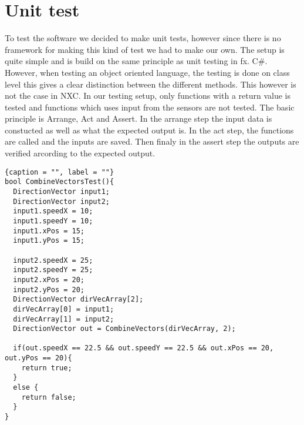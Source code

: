\section{Unit test}

To test the software we decided to make unit tests, however since there is no
framework for making this kind of test we had to make our own. The setup is
quite simple and is build on the same principle as unit testing in fx. C\#.
However, when testing an object oriented language, the testing is done on class
level this gives a clear distinction between the different methods. This however
is not the case in NXC. In our testing setup, only functions with a return
value is tested and functions which uses input from the sensors are not
tested. The basic principle is Arrange, Act and Assert. In the arrange step the
input data is constucted as well as what the expected output is. In the act
step, the functions are called and the inputs are saved. Then finaly in the
assert step the outputs are verified arcording to the expected output. 

\begin{minipage}[H]{\linewidth}
\begin{lstlisting}{caption = "", label = ""}
bool CombineVectorsTest(){
  DirectionVector input1;
  DirectionVector input2;
  input1.speedX = 10;
  input1.speedY = 10;
  input1.xPos = 15;
  input1.yPos = 15;
  
  input2.speedX = 25;
  input2.speedY = 25;
  input2.xPos = 20;
  input2.yPos = 20;
  DirectionVector dirVecArray[2];
  dirVecArray[0] = input1;
  dirVecArray[1] = input2;
  DirectionVector out = CombineVectors(dirVecArray, 2);
  
  if(out.speedX == 22.5 && out.speedY == 22.5 && out.xPos == 20, out.yPos == 20){
    return true;
  }
  else {
    return false;
  }
}
\end{lstlisting}
\end{minipage}
